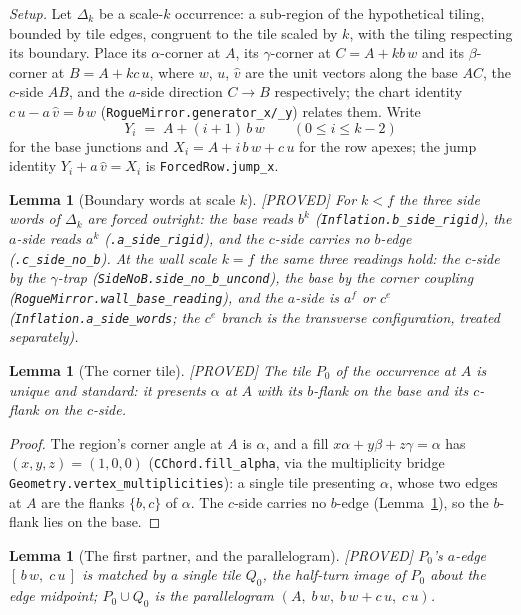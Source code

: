 \documentclass[11pt,reqno]{amsart}
\theoremstyle{plain}
\newtheorem{lemma}[theorem]{Lemma}
\theoremstyle{definition}
\newcommand{\lab}[1]{\hfill\textnormal{\footnotesize\textsc{[#1]}}}
\begin{document}
\emph{Setup.} Let $\Delta_k$ be a scale-$k$ occurrence: a sub-region of the hypothetical tiling,
bounded by tile edges, congruent to the tile scaled by $k$, with the tiling respecting its
boundary. Place its $\alpha$-corner at $A$, its $\gamma$-corner at $C=A+kb\,w$ and its
$\beta$-corner at $B=A+kc\,u$, where $w$, $u$, $\hat v$ are the unit vectors along the base
$AC$, the $c$-side $AB$, and the $a$-side direction $C\to B$ respectively; the chart identity
$c\,u-a\,\hat v=b\,w$ (\texttt{RogueMirror.generator\_x/\_y}) relates them. Write
\[
Y_i \;=\; A+(i+1)\,b\,w \qquad (0\le i\le k-2)
\]
for the base junctions and $X_i=A+i\,b\,w+c\,u$ for the row apexes; the jump identity
$Y_i+a\,\hat v=X_i$ is \texttt{ForcedRow.jump\_x}.

\begin{lemma}[Boundary words at scale $k$]\label{lem:rowwords}\lab{PROVED}
For $k<f$ the three side words of $\Delta_k$ are forced outright: the base reads $b^k$
\textup{(\texttt{Inflation.b\_side\_rigid})}, the $a$-side reads $a^k$
\textup{(\texttt{.a\_side\_rigid})}, and the $c$-side carries no $b$-edge
\textup{(\texttt{.c\_side\_no\_b})}. At the wall scale $k=f$ the same three readings hold:
the $c$-side by the $\gamma$-trap \textup{(\texttt{SideNoB.side\_no\_b\_uncond})}, the base by
the corner coupling \textup{(\texttt{RogueMirror.wall\_base\_reading})}, and the $a$-side is
$a^f$ or $c^e$ \textup{(\texttt{Inflation.a\_side\_words}; the $c^e$ branch is the transverse
configuration, treated separately)}.
\end{lemma}

\begin{lemma}[The corner tile]\label{lem:rowp0}\lab{PROVED}
The tile $P_0$ of the occurrence at $A$ is unique and standard: it presents $\alpha$ at $A$ with
its $b$-flank on the base and its $c$-flank on the $c$-side.
\end{lemma}

\begin{proof}
The region's corner angle at $A$ is $\alpha$, and a fill $x\alpha+y\beta+z\gamma=\alpha$ has
$(x,y,z)=(1,0,0)$ \textup{(\texttt{CChord.fill\_alpha}, via the multiplicity bridge
\texttt{Geometry.vertex\_multiplicities})}: a single tile presenting $\alpha$, whose two edges at
$A$ are the flanks $\{b,c\}$ of $\alpha$. The $c$-side carries no $b$-edge
(Lemma~\ref{lem:rowwords}), so the $b$-flank lies on the base.
\end{proof}

\begin{lemma}[The first partner, and the parallelogram]\label{lem:rowq0}\lab{PROVED}
$P_0$'s $a$-edge $[\,b\,w,\;c\,u\,]$ is matched by a single tile $Q_0$, the half-turn image of
$P_0$ about the edge midpoint; $P_0\cup Q_0$ is the parallelogram $(A,\;b\,w,\;b\,w+c\,u,\;c\,u)$.
\end{lemma}
\end{document}

